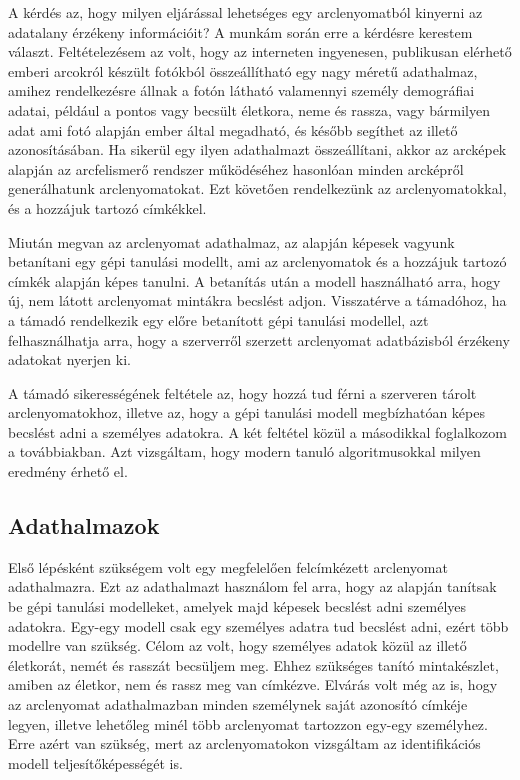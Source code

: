 A kérdés az, hogy milyen eljárással lehetséges egy arclenyomatból kinyerni az adatalany érzékeny információit? A munkám során erre a kérdésre kerestem választ. Feltételezésem az volt, hogy az interneten ingyenesen, publikusan elérhető emberi arcokról készült fotókból összeállítható egy nagy méretű adathalmaz, amihez rendelkezésre állnak a fotón látható valamennyi személy demográfiai adatai, például a pontos vagy becsült életkora, neme és rassza, vagy bármilyen adat ami fotó alapján ember által megadható, és később segíthet az illető azonosításában. Ha sikerül egy ilyen adathalmazt összeállítani, akkor az arcképek alapján az arcfelismerő rendszer működéséhez hasonlóan minden arcképről generálhatunk arclenyomatokat. Ezt követően rendelkezünk az arclenyomatokkal, és a hozzájuk tartozó címkékkel.

Miután megvan az arclenyomat adathalmaz, az alapján képesek vagyunk betanítani egy gépi tanulási modellt, ami az arclenyomatok és a hozzájuk tartozó címkék alapján képes tanulni. A betanítás után a modell használható arra, hogy új, nem látott arclenyomat mintákra becslést adjon. Visszatérve a támadóhoz, ha a támadó rendelkezik egy előre betanított gépi tanulási modellel, azt felhasználhatja arra, hogy a szerverről szerzett arclenyomat adatbázisból érzékeny adatokat nyerjen ki. 

A támadó sikerességének feltétele az, hogy hozzá tud férni a szerveren tárolt arclenyomatokhoz, illetve az, hogy a gépi tanulási modell megbízhatóan képes becslést adni a személyes adatokra. A két feltétel közül a másodikkal foglalkozom a továbbiakban. Azt vizsgáltam, hogy modern tanuló algoritmusokkal milyen eredmény érhető el.

\subsection{Adathalmazok} %

Első lépésként szükségem volt egy megfelelően felcímkézett arclenyomat adathalmazra. Ezt az adathalmazt használom fel arra, hogy az alapján tanítsak be gépi tanulási modelleket, amelyek majd képesek becslést adni személyes adatokra. Egy-egy modell csak egy személyes adatra tud becslést adni, ezért több modellre van szükség. Célom az volt, hogy személyes adatok közül az illető életkorát, nemét és rasszát becsüljem meg. Ehhez szükséges tanító mintakészlet, amiben az életkor, nem és rassz meg van címkézve. Elvárás volt még az is, hogy az arclenyomat adathalmazban minden személynek saját azonosító címkéje legyen, illetve lehetőleg minél több arclenyomat tartozzon egy-egy személyhez. Erre azért van szükség, mert az arclenyomatokon vizsgáltam az identifikációs modell teljesítőképességét is. 

